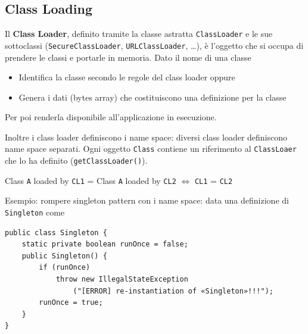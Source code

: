 
\subsection{Class Loading}

Il \textbf{Class Loader}, definito tramite la classe astratta \texttt{ClassLoader} e le sue sottoclassi (\texttt{SecureClassLoader}, \texttt{URLClassLoader}, \dots), è l'oggetto che si occupa di prendere le classi e portarle in memoria. Dato il nome di una classe
\begin{itemize}
    \item Identifica la classe secondo le regole del class loader oppure

    \item Genera i dati (bytes array) che costituiscono una definizione per la classe
\end{itemize}
Per poi renderla disponibile all'applicazione in esecuzione.

Inoltre i class loader definiscono i name space: diversi class loader definiscono name space separati. Ogni oggetto \texttt{Class} contiene un riferimento al \texttt{ClassLoaer} che lo ha definito (\texttt{getClassLoader()}).
\begin{center}
    Class \texttt{A} loaded by \texttt{CL1} = Class \texttt{A} loaded by \texttt{CL2} $\Leftrightarrow$ \texttt{CL1} = \texttt{CL2}
\end{center}

Esempio: rompere singleton pattern con i name space: data una definizione di \texttt{Singleton} come
\begin{verbatim}
public class Singleton {
    static private boolean runOnce = false;
    public Singleton() {
        if (runOnce)
            throw new IllegalStateException
                ("[ERROR] re-instantiation of «Singleton»!!!");
        runOnce = true;
    }
}
\end{verbatim}

